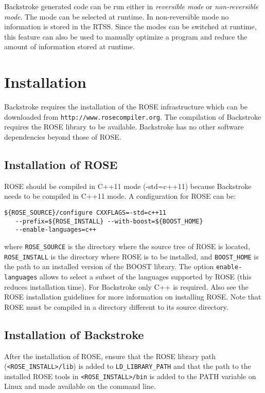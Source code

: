 \documentclass[english,12pt, titlepage]{article}      %
\begin{document}
Backstroke generated code can be run either in {\em reversible mode}
or {\em non-reversible mode}. The mode can be selected at runtime. In
non-reversible mode no information is stored in the RTSS. Since the
modes can be switched at runtime, this feature can also be used to
manually optimize a program and reduce the amount of information
stored at runtime.

\section{Installation}

Backstroke requires the installation of the ROSE infrastructure which can
be downloaded from \verb+http://www.rosecompiler.org+. The
compilation of Backstroke requires the ROSE library to be
available. Backstroke has no other software dependencies beyond those
of ROSE.

\subsection{Installation of ROSE}
ROSE should be compiled in C++11 mode (-std=c++11) because Backstroke
needs to be compiled in C++11 mode. A configuration for ROSE can be:

{ \footnotesize
\begin{verbatim}
${ROSE_SOURCE}/configure CXXFLAGS=-std=c++11
   --prefix=${ROSE_INSTALL} --with-boost=${BOOST_HOME} 
   --enable-languages=c++
\end{verbatim}
}

where \verb+ROSE_SOURCE+ is the directory where the source tree of
ROSE is located, \verb+ROSE_INSTALL+ is the directory where ROSE is to
be installed, and \verb+BOOST_HOME+ is the path to an installed
version of the BOOST library. The option \verb+enable-languages+
allows to select a subset of the languages supported by ROSE (this
reduces installation time). For Backstroke only C++ is required. Also
see the ROSE installation guidelines for more information on
installing ROSE. Note that ROSE must be compiled in a directory
different to its source directory.

\subsection{Installation of Backstroke}

After the installation of ROSE, ensure that the ROSE library path
(\verb+<ROSE_INSTALL>/lib+) is added to \verb+LD_LIBRARY_PATH+ and
that the path to the installed ROSE tools in \verb+<ROSE_INSTALL>/bin+
is added to the PATH variable on Linux and made available on the
command line.
\end{document}
